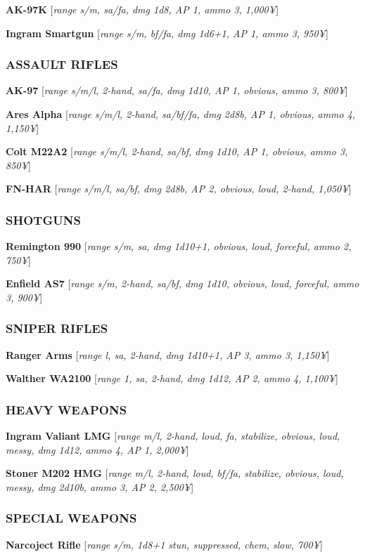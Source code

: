 \documentclass[oneside,10pt]{article}
\begin{document}
\begin{multicols}{2}
  \textbf{AK-97K} [\textit{range s/m, sa/fa, dmg 1d8, AP 1, ammo 3,
    1,000¥}]

  \textbf{Ingram Smartgun} [\textit{range s/m, bf/fa, dmg 1d6+1, AP 1,
    ammo 3, 950¥}]


  \subsubsection{ASSAULT RIFLES}
  \textbf{AK-97} [\textit{range s/m/l, 2-hand, sa/fa, dmg 1d10, AP 1,
    obvious, ammo 3, 800¥}]

  \textbf{Ares Alpha} [\textit{range s/m/l, 2-hand, sa/bf/fa, dmg
    2d8b, AP 1, obvious, ammo 4, 1,150¥}]

  \textbf{Colt M22A2} [\textit{range s/m/l, 2-hand, sa/bf, dmg 1d10,
    AP 1, obvious, ammo 3, 850¥}]

  \textbf{FN-HAR} [\textit{range s/m/l, sa/bf, dmg 2d8b, AP 2,
    obvious, loud, 2-hand, 1,050¥}]


  \subsubsection{SHOTGUNS}
  \textbf{Remington 990} [\textit{range s/m, sa, dmg 1d10+1, obvious,
    loud, forceful, ammo 2, 750¥}]

  \textbf{Enfield AS7} [\textit{range s/m, 2-hand, sa/bf, dmg 1d10,
    obvious, loud, forceful, ammo 3, 900¥}]


  \subsubsection{SNIPER RIFLES}
  \textbf{Ranger Arms} [\textit{range l, sa, 2-hand, dmg 1d10+1, AP 3,
    ammo 3, 1,150¥}]

  \textbf{Walther WA2100} [\textit{range 1, sa, 2-hand, dmg 1d12, AP
    2, ammo 4, 1,100¥}]


  \subsubsection{HEAVY WEAPONS}
  \textbf{Ingram Valiant LMG} [\textit{range m/l, 2-hand, loud, fa,
    stabilize, obvious, loud, messy, dmg 1d12, ammo 4, AP 1, 2,000¥}]

  \textbf{Stoner M202 HMG} [\textit{range m/l, 2-hand, loud, bf/fa,
    stabilize, obvious, loud, messy, dmg 2d10b, ammo 3, AP 2, 2,500¥}]

  \subsubsection{SPECIAL WEAPONS}
  \textbf{Narcoject Rifle} [\textit{range s/m, 1d8+1 stun, suppressed,
    chem, slow, 700¥}]


\end{multicols}
\end{document}
